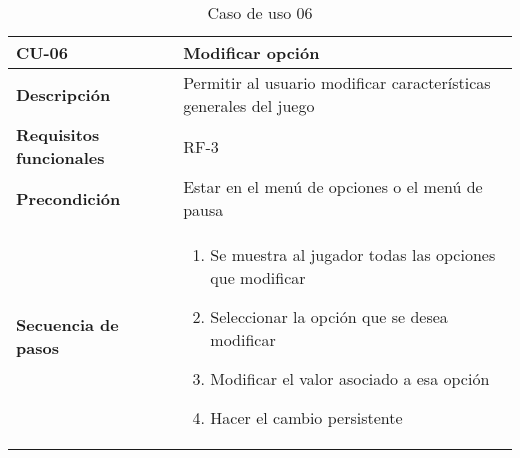 \begin{longtable}{l|l}
\caption{Caso de uso 06}\\
\begin{minipage}{0.25\columnwidth}
\textbf{CU-06} 
\end{minipage}
&
\begin{minipage}{0.65\columnwidth}
Modificar opción
\end{minipage}
\\ \hline

\begin{minipage}{0.25\columnwidth}
\textbf{Descripción} 
\end{minipage}
&
\begin{minipage}{0.65\columnwidth}
Permitir al usuario modificar características generales del juego
\end{minipage}
\\ \hline

\begin{minipage}{0.25\columnwidth}
\textbf{Requisitos funcionales} 
\end{minipage}
&
\begin{minipage}{0.65\columnwidth}
RF-3
\end{minipage}
\\ \hline

\begin{minipage}{0.25\columnwidth}
\textbf{Precondición} 
\end{minipage}
&
\begin{minipage}{0.65\columnwidth}
Estar en el menú de opciones o el menú de pausa
\end{minipage}
\\ \hline

\begin{minipage}{0.25\columnwidth}
\textbf{Secuencia de pasos} 
\end{minipage}
&
\begin{minipage}{0.65\columnwidth}
\begin{enumerate}
\item
Se muestra al jugador todas las opciones que modificar
\item
Seleccionar la opción que se desea modificar
\item
Modificar el valor asociado a esa opción
\item
Hacer el cambio persistente
\end{enumerate}
\end{minipage}
\\ \hline


\end{longtable}
